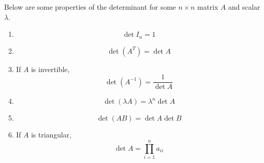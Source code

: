 \noindent
Below are some properties of the determinant for some $n \times n$ matrix $A$ and scalar $\lambda$.
\begin{enumerate}[label=]
	\item \begin{equation*}
		\det{I_n} = 1
	\end{equation*}
	\item \begin{equation*}
		\det{(A^T)} = \det{A}
	\end{equation*}
	\item If $A$ is invertible,
		\begin{equation*}
			\det{(A^{-1})} = \frac{1}{\det{A}}
		\end{equation*}
	\item \begin{equation*}
		\det{(\lambda A)} = \lambda^n\det{A}
	\end{equation*}
	\item \begin{equation*}
		\det{(AB)} = \det{A}\det{B}
	\end{equation*}
	\item If $A$ is triangular,
		\begin{equation*}
			\det{A} = \prod_{i=1}^{n}{a_{ii}}
		\end{equation*}
\end{enumerate}

